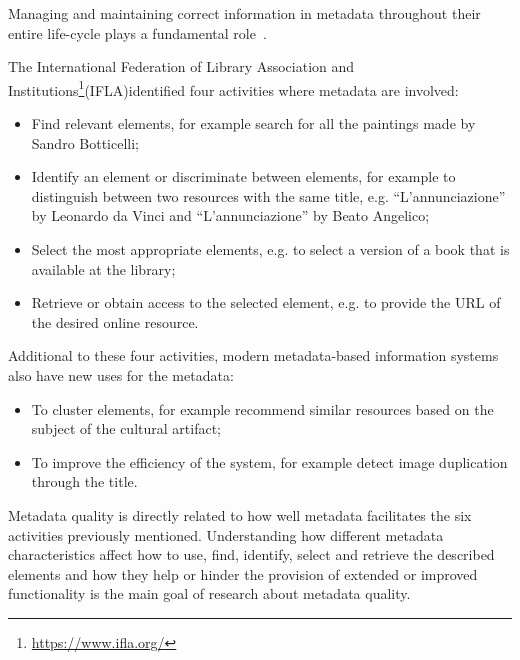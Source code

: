 \documentclass[epsfig,a4paper,12pt,titlepage]{book}
\begin{document}
Managing and maintaining correct information in metadata throughout their entire life-cycle plays a fundamental role~\cite{37}.

The International Federation of Library Association and Institutions\footnote{\url{https://www.ifla.org/}}(IFLA)identified four activities where metadata are involved: 
\begin{itemize}
    \item Find relevant elements, for example search for all the paintings made by Sandro Botticelli;
    \item Identify an element or discriminate between elements, for example to distinguish between two resources with the same title, e.g. ``L'annunciazione'' by Leonardo da Vinci and ``L'annunciazione'' by Beato Angelico;
    \item Select the most appropriate elements, e.g. to select a version of a book that is available at the library;
    \item Retrieve or obtain access to the selected element, e.g. to provide the URL of the desired online resource.
\end{itemize}

Additional to these four activities, modern metadata-based information systems also have new uses for the metadata:

\begin{itemize}
    \item To cluster elements, for example recommend similar resources based on the subject of the cultural artifact;
    \item To improve the efficiency of the system, for example detect image duplication through the title. 
\end{itemize}

Metadata quality is directly related to how well metadata facilitates the six activities previously mentioned. Understanding how different metadata characteristics affect how to use, find, identify, select and retrieve the described elements and how they help or hinder the provision of extended or improved functionality is the main goal of research about metadata quality.
\end{document}
